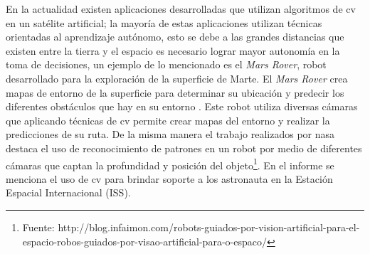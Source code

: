 En la actualidad existen aplicaciones desarrolladas que utilizan algoritmos de \ac{cv} en un satélite artificial; la mayoría de estas aplicaciones utilizan técnicas orientadas al aprendizaje autónomo, esto se debe a las grandes distancias que existen entre la tierra y el espacio  es necesario lograr mayor autonomía en la toma de decisiones, un ejemplo de lo mencionado es el \textit{Mars Rover}, robot desarrollado para la exploración de la superficie de Marte. El \textit{Mars Rover} crea mapas de entorno de la superficie para determinar su ubicación y predecir los diferentes obstáculos que hay en su entorno \citep{RoverMars}. Este robot utiliza  diversas cámaras que aplicando técnicas de \ac{cv}  permite crear mapas del entorno y realizar la predicciones de su ruta. De la misma manera el trabajo realizados  por \ac{nasa}  destaca el uso de reconocimiento de patrones en un robot por medio de diferentes cámaras que captan la profundidad y posición del objeto\footnote{Fuente: 
http://blog.infaimon.com/robots-guiados-por-vision-artificial-para-el-espacio-robos-guiados-por-visao-artificial-para-o-espaco/}. En el informe se menciona el uso de \ac{cv} para brindar soporte a los astronauta en la Estación Espacial Internacional (ISS). 

